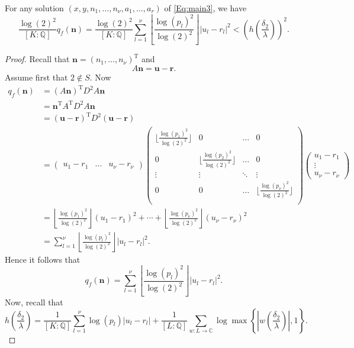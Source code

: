 \begin{lemma}
For any solution $(x,y, n_1, \dots, n_{\nu}, a_1, \dots, a_r)$ of \eqref{Eq:main3}, we have 
\[\frac{\log(2)^2}{[K:\mathbb{Q}]}q_f(\mathbf{n}) = \frac{\log(2)^2}{[K:\mathbb{Q}]}\sum_{l = 1}^{\nu} \left\lfloor\frac{\log(p_l)^2}{\log(2)^2}\right\rfloor|u_l -r_l|^2 < \left(h\left(\frac{\delta_2}{\lambda}\right)\right)^2.\] 
\end{lemma}

\begin{proof}
Recall that $\mathbf{n} = (n_1, \dots, n_{\nu})^{\text{T}}$ and 
\[A\mathbf{n} = \mathbf{u} - \mathbf{r}.\]
Assume first that $2 \notin S$. Now
\begin{align*}
q_f(\mathbf{n})	
	& = (A\mathbf{n})^{\text{T}}D^2A\mathbf{n}\\
	& = \mathbf{n}^{\text{T}}A^{\text{T}}D^2A\mathbf{n}\\
	& = (\mathbf{u} - \mathbf{r})^{\text{T}}D^2(\mathbf{u} - \mathbf{r})\\
	& = \begin{pmatrix} u_1 - r_1&  \dots & u_{\nu} - r_{\nu} \end{pmatrix} 
		\begin{pmatrix} \lfloor\frac{\log(p_1)^2}{\log(2)^2}\rfloor& 0 & \dots & 0\\ 0 &\lfloor\frac{\log(p_2)^2}{\log(2)^2}\rfloor & \dots & 0\\
		\vdots & \vdots & \ddots & \vdots\\ 0 & 0 & \dots & \lfloor\frac{\log(p_{\nu})^2}{\log(2)^2}\rfloor\\ 
		\end{pmatrix} 
		\begin{pmatrix} u_1 - r_1 \\  \vdots \\ u_{\nu} - r_{\nu} \end{pmatrix} \\
	& =\left\lfloor\frac{\log(p_1)^2}{\log(2)^2}\right\rfloor(u_1-r_1)^2 + \cdots + \left\lfloor\frac{\log(p_{\nu})^2}{\log(2)^2}\right\rfloor(u_{\nu}-r_{\nu})^2\\
	& = \sum_{l = 1}^{\nu}\left\lfloor\frac{\log(p_l)^2}{\log(2)^2}\right\rfloor|u_l-r_l|^2.
\end{align*}
Hence it follows that
\[ q_f(\mathbf{n}) = \sum_{l = 1}^{\nu}\left\lfloor\frac{\log(p_l)^2}{\log(2)^2}\right\rfloor|u_l-r_l|^2.\]
Now, recall that
\[h\left(\frac{\delta_2}{\lambda}\right) = \frac{1}{[K:\mathbb{Q}]}\sum_{l = 1}^{\nu} \log(p_l)|u_l - r_l| + \frac{1}{[L:\mathbb{Q}]}\sum_{w :L \to \mathbb{C}} \log \max \left\{ \left|w\left(\frac{\delta_2}{\lambda}\right)\right|, 1\right\}.\]

\end{proof}
